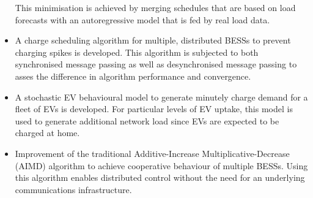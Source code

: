 \begin{itemize}
	This minimisation is achieved by merging schedules that are based on load forecasts with an autoregressive model that is fed by real load data.
	\item
	A charge scheduling algorithm for multiple, distributed BESSs to prevent charging spikes is developed.
	This algorithm is subjected to both synchronised message passing as well as desynchronised message passing to asses the difference in algorithm performance and convergence.
	\item
	A stochastic EV behavioural model to generate minutely charge demand for a fleet of EVs is developed.
	For particular levels of EV uptake, this model is used to generate additional network load since EVs are expected to be charged at home.
	\item
	Improvement of the traditional Additive-Increase Multiplicative-Decrease (AIMD) algorithm to achieve cooperative behaviour of multiple BESSs.
	Using this algorithm enables distributed control without the need for an underlying communications infrastructure.
\end{itemize}
